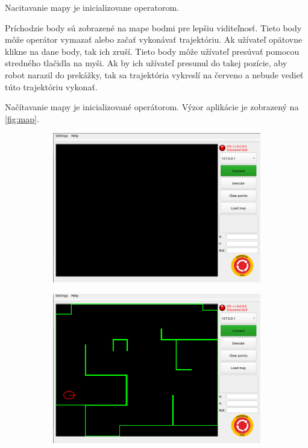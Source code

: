 Nacitavanie mapy je inicializovane operatorom.

Príchodzie body sú zobrazené na mape bodmi pre lepšiu viditeľnosť. Tieto body môže operátor vymazať alebo začať
vykonávať trajektóriu. Ak užívateľ opätovne klikne na dane body, tak ich zruší. Tieto body môže užívateľ presúvať
pomocou stredného tlačidla na myši. Ak by ich užívateľ presunul do takej pozície, aby robot narazil do prekážky, tak sa
trajektória vykreslí na červeno a nebude vedieť túto trajektóriu vykonať.

Načítavanie mapy je inicializované operátorom. Výzor aplikácie je zobrazený na \ref{fig:map}.

\begin{figure}[!htbp]
	\centering
	\begin{subfigure}{0.49\textwidth}
		\includegraphics[width=\textwidth]{img/supervisor_view.png}
	\end{subfigure}
	\hfill
	\begin{subfigure}{0.49\textwidth}
		\includegraphics[width=\textwidth]{img/supervisor_loaded_map.png}
	\end{subfigure}


\end{figure}
